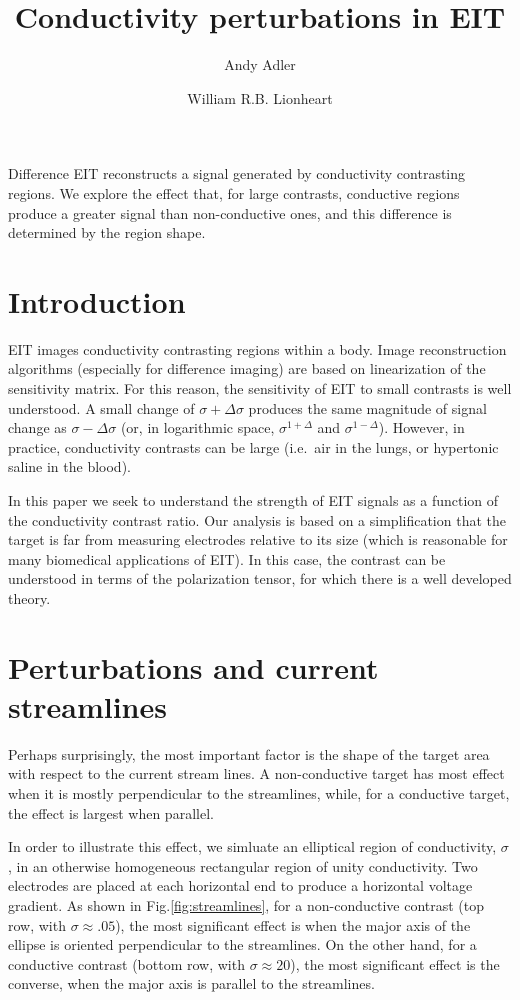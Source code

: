 \documentclass[10pt,a4paper]{article}
\title{%
Conductivity perturbations in EIT
\vspace{-2ex}} %
\author[1]{Andy Adler}
\author[2]{William R.B. Lionheart}
\affil[1]{Systems and Computer Engineering, Carleton University, Ottawa, Canada}
\affil[2]{School of Mathematics, University of Manchester, UK}
\date{}
\begin{document}
\maketitle
\vspace{-1.5cm}
\thispagestyle{empty}

\begin{multicols}{2}

Difference EIT reconstructs a signal generated
by conductivity contrasting regions. We explore
the effect that, for large contrasts, conductive regions
produce a greater signal than non-conductive ones,
and this difference is determined by the region shape.


\section{Introduction}
EIT images conductivity contrasting regions within a body.
Image reconstruction algorithms (especially for difference
imaging) are based on linearization of the sensitivity matrix.
For this reason, the sensitivity of EIT to small contrasts
is well understood. A small change of
 $\sigma + \Delta \sigma$
produces the same magnitude of signal change as
 $\sigma - \Delta \sigma$ 
(or, in logarithmic space,
 $\sigma^{1+\Delta}$ and 
 $\sigma^{1-\Delta}$).
However, in practice, conductivity contrasts can be large
(i.e.\ air in the lungs, or hypertonic saline in the blood).

In this paper we seek to understand the strength of EIT signals as a
function of the conductivity contrast ratio.
Our analysis is based on a simplification that
the target is far from measuring electrodes relative to its size
(which is reasonable for many biomedical applications of EIT). 
In this case, the contrast can be understood in terms of the
polarization tensor, for which there is a well developed theory\cite{amari2007}.


\section{Perturbations and current streamlines} 
Perhaps surprisingly, the most important factor is the shape
of the target area with respect to the current stream lines.
A non-conductive target has most effect when it is mostly 
perpendicular to the streamlines, while, for a conductive target,
the effect is largest when parallel.


In order to illustrate this effect,
we simluate an elliptical region of conductivity,
$\sigma$, in an otherwise homogeneous rectangular region of unity conductivity.
Two electrodes are placed at each horizontal end to produce 
a horizontal voltage gradient.
As shown in Fig.\ref{fig:streamlines}, for a non-conductive contrast
(top row, with $\sigma\approx.05$), the most significant effect is when the
major axis of the ellipse is oriented perpendicular to the streamlines. 
On the other hand, for a conductive contrast (bottom row, with $\sigma\approx20$), the
most significant effect is the converse, when the major axis is parallel
to the streamlines.



\end{multicols}
\end{document}

